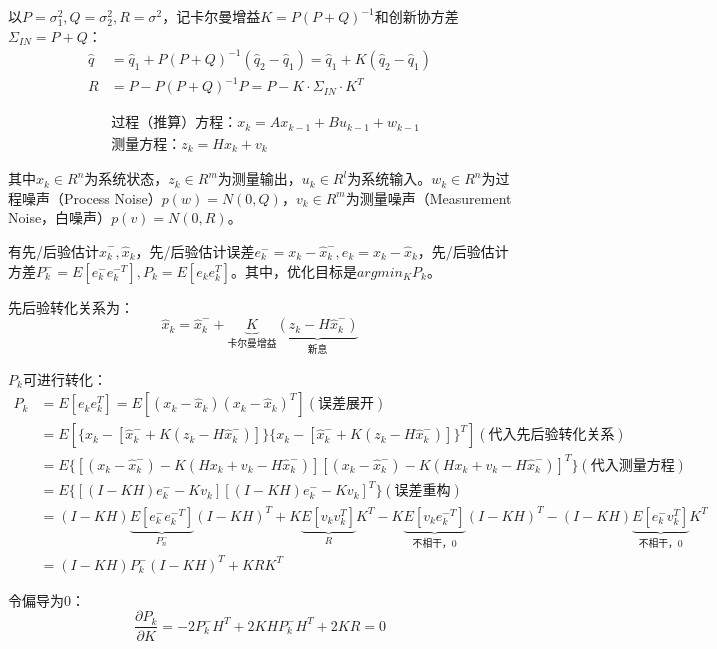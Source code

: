 \documentclass[
12pt, %
a4paper, 
oneside, %
headinclude,footinclude, %
]{scrartcl}
\begin{document}
以$ P = \sigma_1^2, Q = \sigma_2^2, R = \sigma^2 $，记卡尔曼增益$ K = P(P + Q)^{-1} $和创新协方差$ \Sigma_{IN} = P + Q $：
\begin{align*}
\hat{q} &= \hat{q}_1 + P(P + Q)^{-1}(\hat{q}_2 - \hat{q}_1) = \hat{q}_1 + K(\hat{q}_2 - \hat{q}_1) \\
R &= P - P(P + Q)^{-1}P = P - K \cdot \Sigma_{IN} \cdot K^T
\end{align*}

\begin{align*}
&\text{过程（推算）方程：}x_k = A x_{k - 1} + B u_{k - 1} + w_{k - 1} \\
&\text{测量方程：}z_k = H x_k + v_k
\end{align*}

其中$ x_k \in R^n $为系统状态，$ z_k \in R^m $为测量输出，$ u_k \in R^l $为系统输入。$ w_k \in R^n $为过程噪声（Process Noise）$ p(w) = N(0, Q) $，$ v_k \in R^m $为测量噪声（Measurement Noise，白噪声）$ p(v) = N(0, R) $。

有先/后验估计$ \hat{x}_k^-, \hat{x}_k $，先/后验估计误差$ e_k^- = x_k - \hat{x}_k^-, e_k = x_k - \hat{x}_k $，先/后验估计方差$ P_k^- = E[e_k^- e_k^{-T}], P_k = E[e_k e_k^T] $。其中，优化目标是$ argmin_K P_k $。

先后验转化关系为：
$$ \hat{x}_k = \hat{x}_k^- + \underbrace{K}_{\text{卡尔曼增益}}\underbrace{(z_k - H \hat{x}_k^-)}_{\text{新息}} $$

$ P_k $可进行转化：
\begin{align*}
P_k &= E[e_k e_k^T] = E[(x_k - \hat{x}_k)(x_k - \hat{x}_k)^T] (\text{误差展开}) \\
&= E[\{x_k - [\hat{x}_k^- + K(z_k - H\hat{x}_k^-)]\} \{x_k - [\hat{x}_k^- + K(z_k - H\hat{x}_k^-)]\}^T] (\text{代入先后验转化关系}) \\
&= E\{[(x_k - \hat{x}_k^-) - K(H x_k + v_k - H \hat{x}_k^-)][(x_k - \hat{x}_k^-) - K(H x_k + v_k - H \hat{x}_k^-)]^T\} (\text{代入测量方程}) \\
&= E\{[(I - KH)e_k^- - Kv_k][(I - KH)e_k^- - Kv_k]^T\} (\text{误差重构}) \\
&= (I - KH) \underbrace{E[e_k^- e_k^{-T}]}_{P_n^-} (I - KH)^T + K \underbrace{E[v_k v_k^T]}_{R} K^T - K \underbrace{E[v_k e_k^{-T}]}_{\text{不相干，}0} (I - KH)^T -(I - KH) \underbrace{E[e_k^- v_k^T]}_{\text{不相干，}0} K^T \\
&= (I - KH)P_k^-(I - KH)^T + KRK^T
\end{align*}

令偏导为$ 0 $：
$$ \frac{\partial P_k}{\partial K} = -2P_k^- H^T + 2K H P_k^- H^T + 2KR = 0 $$
\end{document}
